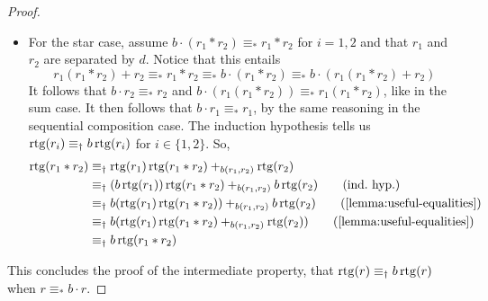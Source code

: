 \documentclass[orivec,envcountsect,envcountsame]{llncs}
\begin{document}
\begin{proof}
\begin{itemize}
		\item For the star case, assume \(b \cdot (r_1*r_2) \equiv_* r_1 * r_2\) for \(i = 1,2\) and that \(r_1\) and \(r_2\) are separated by \(d\).
		Notice that this entails
		\[
			r_1 (r_1*r_2) + r_2 \equiv_* r_1 * r_2 \equiv_* b\cdot (r_1 * r_2) \equiv_* b \cdot (r_1 (r_1*r_2) + r_2)
		\]
		It follows that \(b \cdot r_2 \equiv_* r_2\) and \(b \cdot (r_1(r_1 * r_2)) \equiv_* r_1(r_1*r_2)\), like in the sum case.
		It then follows that \(b \cdot r_1 \equiv_* r_1\), by the same reasoning in the sequential composition case.
		The induction hypothesis tells us \(\operatorname{rtg}(r_i) \equiv_\dagger b\operatorname{rtg}(r_i)\) for \(i \in \{1,2\}\).
		So,
		\begin{align*}
			\rtg(r_1*r_2)
			&\equiv_\dagger \rtg(r_1)\rtg(r_1 * r_2) +_{b(r_1,r_2)} \rtg(r_2) \\
			&\equiv_\dagger (b\rtg(r_1))\rtg(r_1 * r_2) +_{b(r_1,r_2)} b\rtg(r_2) \tag{ind.~hyp.}\\
			&\equiv_\dagger b(\rtg(r_1)\rtg(r_1 * r_2)) +_{b(r_1,r_2)} b\rtg(r_2) \tag{\cref{lemma:useful-equalities}}\\
			&\equiv_\dagger b(\rtg(r_1)\rtg(r_1 * r_2) +_{b(r_1,r_2)} \rtg(r_2)) \tag{\cref{lemma:useful-equalities}}\\
			&\equiv_\dagger b\rtg(r_1 * r_2)
		\end{align*}
	\end{itemize}
	This concludes the proof of the intermediate property, that \(\operatorname{rtg}(r) \equiv_\dagger b\operatorname{rtg}(r)\) when \(r \equiv_* b\cdot r\).


\end{proof}
\end{document}
